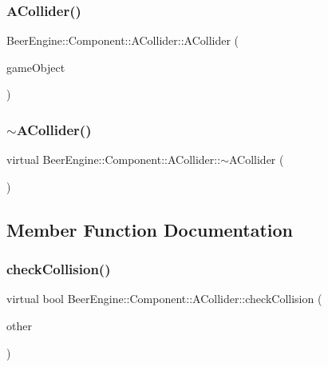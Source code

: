 \subsubsection{\texorpdfstring{A\+Collider()}{ACollider()}}
{\footnotesize\ttfamily Beer\+Engine\+::\+Component\+::\+A\+Collider\+::\+A\+Collider (\begin{DoxyParamCaption}\item[{\mbox{\hyperlink{class_beer_engine_1_1_game_object}{Game\+Object}} $\ast$}]{game\+Object }\end{DoxyParamCaption})}

\mbox{\label{class_beer_engine_1_1_component_1_1_a_collider_a10094dea61f15535b8707b7171adc15f}} 
\subsubsection{\texorpdfstring{$\sim$\+A\+Collider()}{~ACollider()}}
{\footnotesize\ttfamily virtual Beer\+Engine\+::\+Component\+::\+A\+Collider\+::$\sim$\+A\+Collider (\begin{DoxyParamCaption}{ }\end{DoxyParamCaption})\hspace{0.3cm}{\ttfamily [virtual]}}



\subsection{Member Function Documentation}
\mbox{\label{class_beer_engine_1_1_component_1_1_a_collider_ad9367c0e75c941509322fb984d16de00}} 
\subsubsection{\texorpdfstring{check\+Collision()}{checkCollision()}}
{\footnotesize\ttfamily virtual bool Beer\+Engine\+::\+Component\+::\+A\+Collider\+::check\+Collision (\begin{DoxyParamCaption}\item[{\mbox{\hyperlink{class_beer_engine_1_1_component_1_1_a_collider}{A\+Collider}} $\ast$}]{other }\end{DoxyParamCaption})\hspace{0.3cm}{\ttfamily [pure virtual]}}



